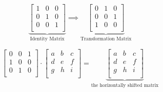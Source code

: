 \documentclass[10pt]{report}
\begin{document}
\[
  \underbrace{
  \begin{bmatrix}
  1&0&0\\
  0&1&0\\
  0&0&1\\
  \end{bmatrix}
}_{\text{Identity Matrix}}
  \implies
  \underbrace{
  \begin{bmatrix}
  0&1&0\\
  0&0&1\\
  1&0&0\\
  \end{bmatrix}
}_{\text{Transformation Matrix}}
\]

\[ 
  \begin{bmatrix}
  0&0&1\\
  1&0&0\\
  0&1&0\\
  \end{bmatrix}
  \cdot
  \begin{bmatrix}
  a&b&c\\
  d&e&f\\
  g&h&i\\
\end{bmatrix}
=
\underbrace{
  \begin{bmatrix}
  a&b&c\\
  d&e&f\\
  g&h&i\\
\end{bmatrix}
}_{\text{the horizontally shifted matrix}}
\]
\end{document}
